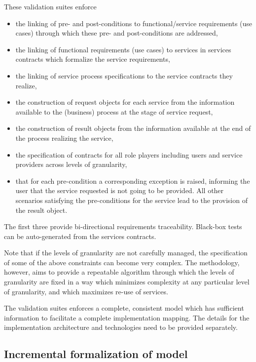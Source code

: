 These validation suites enforce
\begin{itemize}
  \item the linking of pre- and post-conditions to functional/service
			requirements (use cases) through which these pre- and post-conditions are
			addressed,
	\item the linking of functional requirements (use cases) to services
			in services contracts which formalize the service requirements,
	\item the linking of service process specifications to the service contracts they realize,
	\item the construction of request objects for each service
			from the information available to the (business) process at the
			stage of service request,
	\item the construction of result objects from the information available
			at the end of the process realizing the service,
	\item the specification of contracts for all role players
			including users and service providers across levels of granularity,
	\item that for each pre-condition a corresponding exception is raised,
			informing the user that the service requested is not going to be provided.
			All other scenarios satisfying the pre-conditions for the service
			lead to the provision of the result object.
\end{itemize}
The first three provide bi-directional requirements traceability. Black-box
tests can be auto-generated from the services contracts.

Note that if the levels of granularity are not carefully managed,
the specification of some of the above constraints can become very complex. The
methodology, however, aims to provide a repeatable algorithm through which the levels
of granularity are fixed in a way which minimizes complexity at any particular level
of granularity, and which maximizes re-use of services.

The validation suites enforces a complete, consistent model which has sufficient
information to facilitate a complete implementation mapping. The details for the
implementation architecture and technologies need to be provided separately.


\subsection{Incremental formalization of model}


